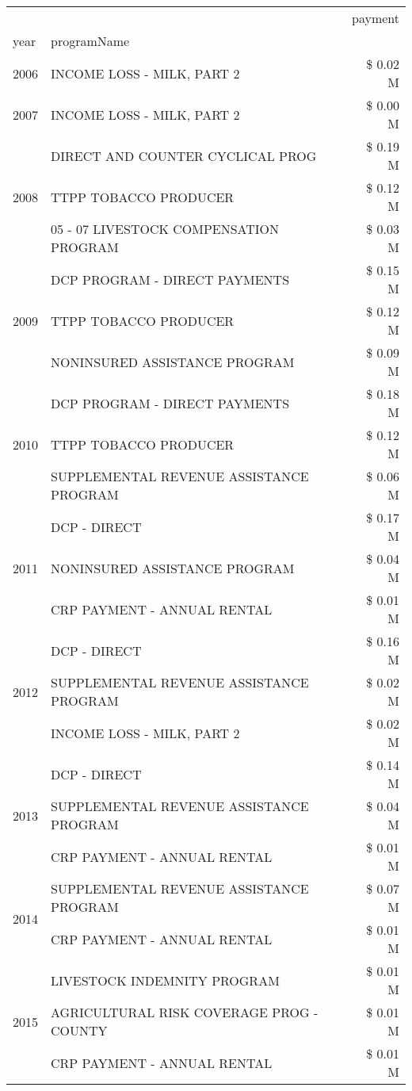 \begin{tabular}{llr}
\toprule
 &  & payment \\
year & programName &  \\
\midrule
2006 & INCOME LOSS - MILK, PART 2 & \$ 0.02 M \\
\cline{1-3}
2007 & INCOME LOSS - MILK, PART 2 & \$ 0.00 M \\
\cline{1-3}
\multirow[t]{3}{*}{2008} & DIRECT AND COUNTER CYCLICAL PROG & \$ 0.19 M \\
 & TTPP TOBACCO PRODUCER & \$ 0.12 M \\
 & 05 - 07 LIVESTOCK COMPENSATION PROGRAM & \$ 0.03 M \\
\cline{1-3}
\multirow[t]{3}{*}{2009} & DCP PROGRAM - DIRECT PAYMENTS & \$ 0.15 M \\
 & TTPP TOBACCO PRODUCER & \$ 0.12 M \\
 & NONINSURED ASSISTANCE PROGRAM & \$ 0.09 M \\
\cline{1-3}
\multirow[t]{3}{*}{2010} & DCP PROGRAM - DIRECT PAYMENTS & \$ 0.18 M \\
 & TTPP TOBACCO PRODUCER & \$ 0.12 M \\
 & SUPPLEMENTAL REVENUE ASSISTANCE PROGRAM & \$ 0.06 M \\
\cline{1-3}
\multirow[t]{3}{*}{2011} & DCP - DIRECT & \$ 0.17 M \\
 & NONINSURED ASSISTANCE PROGRAM & \$ 0.04 M \\
 & CRP PAYMENT - ANNUAL RENTAL & \$ 0.01 M \\
\cline{1-3}
\multirow[t]{3}{*}{2012} & DCP - DIRECT & \$ 0.16 M \\
 & SUPPLEMENTAL REVENUE ASSISTANCE PROGRAM & \$ 0.02 M \\
 & INCOME LOSS - MILK, PART 2 & \$ 0.02 M \\
\cline{1-3}
\multirow[t]{3}{*}{2013} & DCP - DIRECT & \$ 0.14 M \\
 & SUPPLEMENTAL REVENUE ASSISTANCE PROGRAM & \$ 0.04 M \\
 & CRP PAYMENT - ANNUAL RENTAL & \$ 0.01 M \\
\cline{1-3}
\multirow[t]{2}{*}{2014} & SUPPLEMENTAL REVENUE ASSISTANCE PROGRAM & \$ 0.07 M \\
 & CRP PAYMENT - ANNUAL RENTAL & \$ 0.01 M \\
\cline{1-3}
\multirow[t]{3}{*}{2015} & LIVESTOCK INDEMNITY PROGRAM & \$ 0.01 M \\
 & AGRICULTURAL RISK COVERAGE PROG - COUNTY & \$ 0.01 M \\
 & CRP PAYMENT - ANNUAL RENTAL & \$ 0.01 M \\

\end{tabular}
